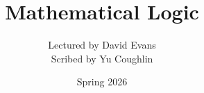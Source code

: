 \documentclass{article}
\begin{document}
\title{Mathematical Logic}
\author{Lectured by David Evans \\
Scribed by Yu Coughlin}
\date{Spring 2026}

\maketitle

\tableofcontents
\end{document}
